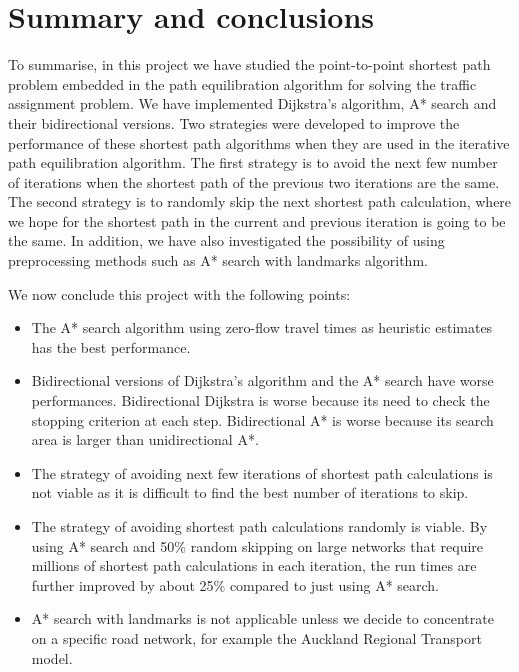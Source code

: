 \chapter{Summary and conclusions} \label{chap:conclusions}
To summarise,
in this project we have studied the point-to-point shortest path problem embedded in the path equilibration algorithm for solving the traffic assignment problem.
We have implemented Dijkstra's algorithm, A* search and their bidirectional versions.
Two strategies were developed to improve the performance of these shortest path algorithms when they are used in the iterative path equilibration algorithm.
The first strategy is to avoid the next few number of iterations
when the shortest path of the previous two iterations are the same.
The second strategy is to randomly skip the next shortest path calculation,
where we hope for the shortest path in the current and previous iteration is going to be the same.
In addition,
we have also investigated the possibility of using preprocessing methods such as A* search with landmarks algorithm.

We now conclude this project with the following points:
\begin{itemize}
    \item The A* search algorithm using zero-flow travel times as heuristic estimates has the best performance.
    \item Bidirectional versions of Dijkstra's algorithm and the A* search have worse performances. Bidirectional Dijkstra is worse because its need to check the stopping criterion at each step. Bidirectional A* is worse because its search area is larger than unidirectional A*.
    \item The strategy of avoiding next few iterations of shortest path calculations is not viable as it is difficult to find the best number of iterations to skip.
    \item The strategy of avoiding shortest path calculations randomly is viable. By using A* search and 50\% random skipping on large networks that require millions of shortest path calculations in each iteration, the run times are further improved by about 25\% compared to just using A* search.
    \item A* search with landmarks is not applicable unless we decide to concentrate on a specific road network, for example the Auckland Regional Transport model.
\end{itemize}

